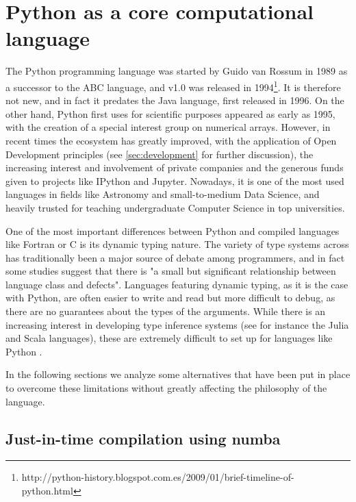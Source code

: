 \section{Python as a core computational language}
\label{sec:python}

The Python programming language was started by Guido van Rossum in 1989 as a successor to the ABC language, and v1.0 was released in 1994\footnote{http://python-history.blogspot.com.es/2009/01/brief-timeline-of-python.html}. It is therefore not new, and in fact it predates the Java language, first released in 1996. On the other hand, Python first uses for scientific purposes appeared as early as 1995, with the creation of a special interest group on numerical arrays\cite{Millman_2011}. However, in recent times the ecosystem has greatly improved, with the application of Open Development principles (see \ref{sec:development} for further discussion), the increasing interest and involvement of private companies and the generous funds given to projects like IPython\cite{Perez_2007} and Jupyter. Nowadays, it is one of the most used languages in fields like Astronomy\cite{2015arXiv150703989M} and small-to-medium Data Science, and heavily trusted for teaching undergraduate Computer Science in top universities\cite{guo2014python}.

One of the most important differences between Python and compiled languages like Fortran or C is its dynamic typing nature. The variety of type systems across has traditionally been a major source of debate among programmers, and in fact some studies suggest that there is "a small but significant relationship between language class and defects"\cite{Ray2014}. Languages featuring dynamic typing, as it is the case with Python, are often easier to write and read but more difficult to debug, as there are no guarantees about the types of the arguments. While there is an increasing interest in developing type inference systems (see for instance the Julia and Scala languages), these are extremely difficult to set up for languages like Python \cite{cannon2005localized}.


In the following sections we analyze some alternatives that have been put in place to overcome these limitations without greatly affecting the philosophy of the language.

\subsection{Just-in-time compilation using numba}

